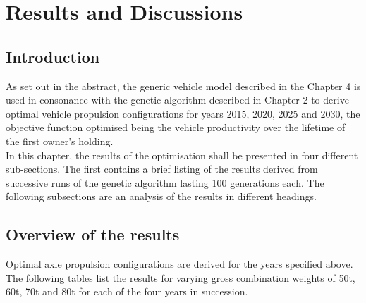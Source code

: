 \documentclass[ExampleMasters.tex]{subfiles}
\begin{document}
\chapter{Results and Discussions}

\section{Introduction}
	As set out in the abstract, the generic vehicle model described in the Chapter 4 is used in consonance with the genetic algorithm described in Chapter 2 to derive optimal vehicle propulsion configurations for years 2015, 2020, 2025 and 2030, the objective function optimised being the vehicle productivity over the lifetime of the first owner's holding.\\

	In this chapter, the results of the optimisation shall be presented in four different sub-sections. The first contains a brief listing of the results derived from successive runs of the genetic algorithm lasting 100 generations each. The following subsections are an analysis of the results in different headings.

\section{Overview of the results}
	Optimal axle propulsion configurations are derived for the years specified above. The following tables list the results for varying gross combination weights of 50t, 60t, 70t and 80t for each of the four years in succession.
\end{document}
